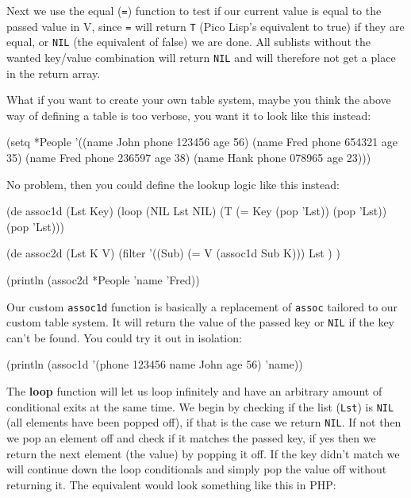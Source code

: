 Next we use the equal (\texttt{=}) function to test if our current
value is equal to the passed value in V, since \texttt{=} will return
\texttt{T} (Pico Lisp's equivalent to true) if they are equal, or \texttt{NIL}
(the equivalent of false) we are done. All sublists without the wanted
key/value combination will return \texttt{NIL} and will therefore not get a
place in the return array.

What if you want to create your own table system, maybe you think the
above way of defining a table is too verbose, you want it to look like
this instead:

\begin{wideverbatim}
(setq *People 
      '((name John phone 123456 age 56)
        (name Fred phone 654321 age 35)
        (name Fred phone 236597 age 38)
        (name Hank phone 078965 age 23)))
\end{wideverbatim}

No problem, then you could define the lookup logic like this instead:

\begin{wideverbatim}
(de assoc1d (Lst Key) 
    (loop
     (NIL Lst NIL)
     (T (= Key (pop 'Lst)) (pop 'Lst))
     (pop 'Lst)))

(de assoc2d (Lst K V)
    (filter '((Sub)
              (= V (assoc1d Sub K))) Lst ) )

(println (assoc2d *People 'name 'Fred))
\end{wideverbatim}

Our custom \texttt{assoc1d} function is basically a replacement of
\texttt{assoc} tailored to our custom table system. It will return the
value of the passed key or \texttt{NIL} if the key can't be found. You
could try it out in isolation:

\begin{wideverbatim}
(println (assoc1d '(phone 123456 name John age 56) 'name))
\end{wideverbatim}

The \textbf{loop} function will let us loop infinitely and have an
arbitrary amount of conditional exits at the same time. We begin by
checking if the list (\texttt{Lst}) is \texttt{NIL} (all elements have
been popped off), if that is the case we return \texttt{NIL}. If not then we
pop an element off and check if it matches the passed key, if yes then
we return the next element (the value) by popping it off. If the key
didn't match we will continue down the loop conditionals and simply
pop the value off without returning it. The equivalent would look
something like this in PHP:

